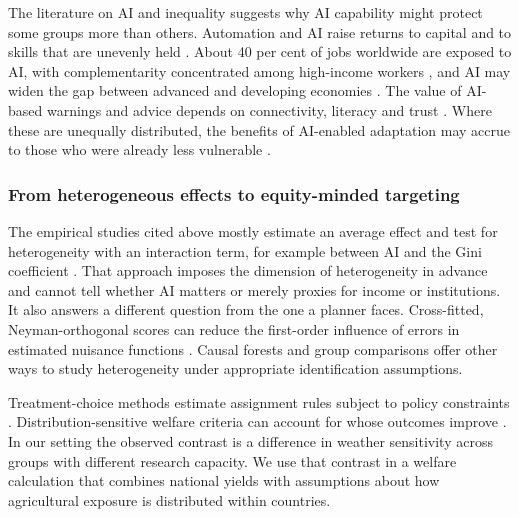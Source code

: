 The literature on AI and inequality suggests why AI capability might protect some groups more than
others. Automation and AI raise returns to capital and to skills that are unevenly held
\citep{acemoglu2018,acemoglu2020,felten2021}. About 40 per cent of jobs worldwide are exposed to AI,
with complementarity concentrated among high-income workers \citep{cazzaniga2024}, and AI may widen
the gap between advanced and developing economies \citep{korinek2021}. The value of AI-based
warnings and advice depends on connectivity, literacy and trust \citep{worldbank2016}. Where these
are unequally distributed, the benefits of AI-enabled adaptation may accrue to those who were
already less vulnerable \citep{larosa2024}.

\subsubsection{From heterogeneous effects to equity-minded targeting}

The empirical studies cited above mostly estimate an average effect and test for heterogeneity with
an interaction term, for example between AI and the Gini coefficient \citep{dong2024}. That approach
imposes the dimension of heterogeneity in advance and cannot tell whether AI matters or merely
proxies for income or institutions. It also answers a different question from the one a planner
faces. Cross-fitted, Neyman-orthogonal scores can reduce the first-order influence of
errors in estimated nuisance functions \citep{robinson1988,chernozhukov2018}. Causal forests
\citep{wager2018,athey2019} and group comparisons \citep{chernozhukov2025} offer other ways to
study heterogeneity under appropriate identification assumptions.

Treatment-choice methods estimate assignment rules subject to policy constraints
\citep{manski2004,kitagawa2018,athey2021}. Distribution-sensitive welfare criteria can account
for whose outcomes improve \citep{kitagawa2021}. In our setting the observed contrast is a
difference in weather sensitivity across groups with different research capacity. We use that
contrast in a welfare calculation that combines national yields with assumptions about how
agricultural exposure is distributed within countries.

